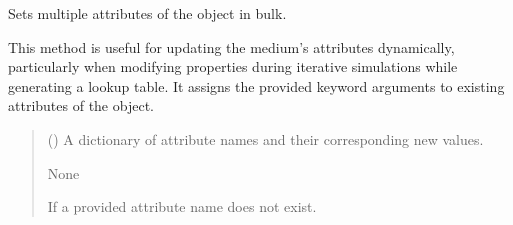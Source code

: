 \documentclass[letterpaper,10pt,english]{sphinxmanual}
\begin{document}
\begin{fulllineitems}

\begin{fulllineitems}
\label{\detokenize{generated/photon_canon.optics:photon_canon.optics.Medium.set}}
\pysigstartsignatures
\pysiglinewithargsret
{}
{}
{}
\pysigstopsignatures
\sphinxAtStartPar
Sets multiple attributes of the object in bulk.

\sphinxAtStartPar
This method is useful for updating the medium’s attributes dynamically, particularly when modifying properties
during iterative simulations while generating a lookup table. It assigns the provided keyword arguments to
existing attributes of the object.
\begin{quote}\begin{description}
\sphinxAtStartPar
{} () \textendash{} A dictionary of attribute names and their corresponding new values.

\sphinxAtStartPar
{}

\sphinxAtStartPar
None

\sphinxAtStartPar
{} \textendash{} If a provided attribute name does not exist.

\end{description}\end{quote}

\end{fulllineitems}


\begin{fulllineitems}
\label{\detokenize{generated/photon_canon.optics:photon_canon.optics.Medium.wavelengths}}
\pysigstartsignatures
\pysigline
{}
\pysigstopsignatures
\end{fulllineitems}


\end{fulllineitems}
\end{document}
